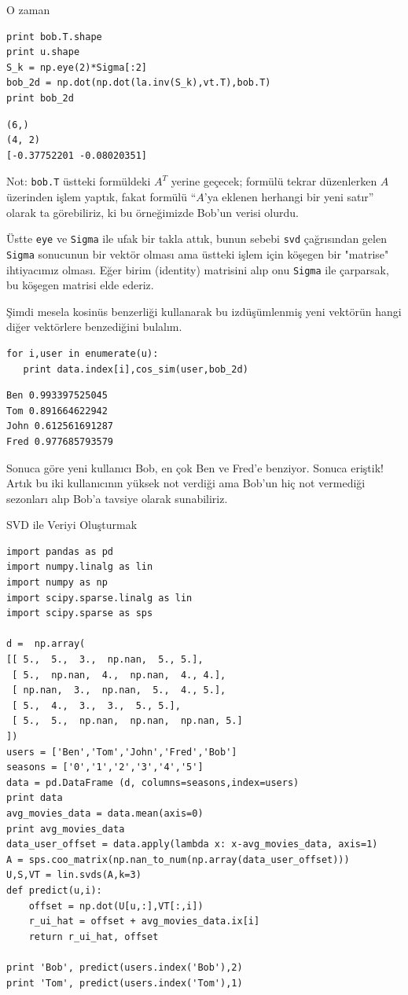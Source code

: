 \documentclass[12pt,fleqn]{article}\usepackage{../../common}
\begin{document}
O zaman 

\begin{verbatim}
print bob.T.shape
print u.shape
S_k = np.eye(2)*Sigma[:2]
bob_2d = np.dot(np.dot(la.inv(S_k),vt.T),bob.T)
print bob_2d
\end{verbatim}

\begin{verbatim}
(6,)
(4, 2)
[-0.37752201 -0.08020351]
\end{verbatim}

Not: \verb!bob.T! üstteki formüldeki $A^T$ yerine geçecek; formülü tekrar
düzenlerken $A$ üzerinden işlem yaptık, fakat formülü ``$A$'ya eklenen
herhangi bir yeni satır'' olarak ta görebiliriz, ki bu örneğimizde Bob'un
verisi olurdu. 

Üstte \verb!eye! ve \verb!Sigma! ile ufak bir takla attık, bunun sebebi
\verb!svd! çağrısından gelen \verb!Sigma!  sonucunun bir vektör olması ama
üstteki işlem için köşegen bir "matrise" ihtiyacımız olması. Eğer birim
(identity) matrisini alıp onu \verb!Sigma! ile çarparsak, bu köşegen
matrisi elde ederiz.

Şimdi mesela kosinüs benzerliği kullanarak bu izdüşümlenmiş yeni
vektörün hangi diğer vektörlere benzediğini bulalım.

\begin{verbatim}
for i,user in enumerate(u):
   print data.index[i],cos_sim(user,bob_2d)
\end{verbatim}

\begin{verbatim}
Ben 0.993397525045
Tom 0.891664622942
John 0.612561691287
Fred 0.977685793579
\end{verbatim}

Sonuca göre yeni kullanıcı Bob, en çok Ben ve Fred'e benziyor. Sonuca
eriştik! Artık bu iki kullanıcının yüksek not verdiği ama Bob'un hiç
not vermediği sezonları alıp Bob'a tavsiye olarak sunabiliriz.

SVD ile Veriyi Oluşturmak

\begin{verbatim}
import pandas as pd
import numpy.linalg as lin
import numpy as np
import scipy.sparse.linalg as lin
import scipy.sparse as sps

d =  np.array(
[[ 5.,  5.,  3.,  np.nan,  5., 5.],
 [ 5.,  np.nan,  4.,  np.nan,  4., 4.],
 [ np.nan,  3.,  np.nan,  5.,  4., 5.],
 [ 5.,  4.,  3.,  3.,  5., 5.],
 [ 5.,  5.,  np.nan,  np.nan,  np.nan, 5.]
])
users = ['Ben','Tom','John','Fred','Bob']
seasons = ['0','1','2','3','4','5']
data = pd.DataFrame (d, columns=seasons,index=users)
print data
avg_movies_data = data.mean(axis=0)
print avg_movies_data
data_user_offset = data.apply(lambda x: x-avg_movies_data, axis=1)
A = sps.coo_matrix(np.nan_to_num(np.array(data_user_offset)))
U,S,VT = lin.svds(A,k=3)
def predict(u,i):
    offset = np.dot(U[u,:],VT[:,i]) 
    r_ui_hat = offset + avg_movies_data.ix[i] 
    return r_ui_hat, offset

print 'Bob', predict(users.index('Bob'),2)
print 'Tom', predict(users.index('Tom'),1)
\end{verbatim}
\end{document}
